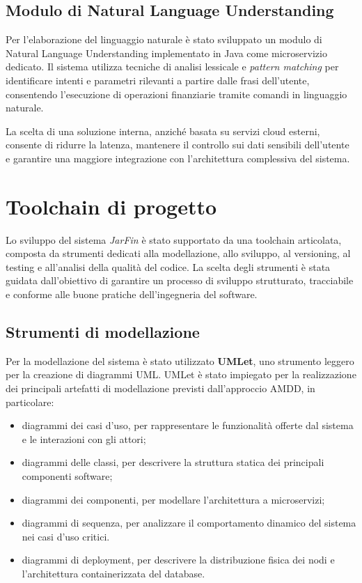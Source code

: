 \subsection{Modulo di Natural Language Understanding}

Per l’elaborazione del linguaggio naturale è stato sviluppato un modulo di Natural Language Understanding implementato in Java come microservizio dedicato. Il sistema utilizza tecniche di analisi lessicale e \textit{pattern matching} per identificare intenti e parametri rilevanti a partire dalle frasi dell’utente, consentendo l’esecuzione di operazioni finanziarie tramite comandi in linguaggio naturale.

La scelta di una soluzione interna, anziché basata su servizi cloud esterni, consente di ridurre la latenza, mantenere il controllo sui dati sensibili dell’utente e garantire una maggiore integrazione con l’architettura complessiva del sistema.

\section{Toolchain di progetto}

Lo sviluppo del sistema \textit{JarFin} è stato supportato da una toolchain articolata, composta da strumenti dedicati alla modellazione, allo sviluppo, al versioning, al testing e all’analisi della qualità del codice.
La scelta degli strumenti è stata guidata dall’obiettivo di garantire un processo di sviluppo strutturato, tracciabile e conforme alle buone pratiche dell’ingegneria del software.

\subsection{Strumenti di modellazione}

Per la modellazione del sistema è stato utilizzato \textbf{UMLet}, uno strumento leggero per la creazione di diagrammi UML. UMLet è stato impiegato per la realizzazione dei principali artefatti di modellazione previsti dall’approccio AMDD, in particolare:
\begin{itemize}
    \item diagrammi dei casi d’uso, per rappresentare le funzionalità offerte dal sistema e le interazioni con gli attori;
    \item diagrammi delle classi, per descrivere la struttura statica dei principali componenti software;
    \item diagrammi dei componenti, per modellare l’architettura a microservizi;
    \item diagrammi di sequenza, per analizzare il comportamento dinamico del sistema nei casi d’uso critici.
    \item diagrammi di deployment, per descrivere la distribuzione fisica dei nodi e l'architettura containerizzata del database.
\end{itemize}

